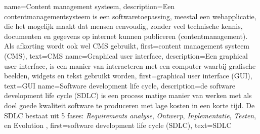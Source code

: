 \makenoidxglossaries

{
	name={Content management systeem},
	description={Een contentmanagementsysteem is een softwaretoepassing,
			meestal een webapplicatie, die het mogelijk maakt dat mensen eenvoudig, zonder veel technische kennis,
			documenten en gegevens op internet kunnen publiceren (contentmanagement).
			Als afkorting wordt ook wel CMS gebruikt},
	first={content management systeem (CMS)},
	text={CMS}
}
{
	name={Graphical user interface},
	description={Een graphical user interface, is een manier van interacteren met een computer waarbij grafische beelden, widgets en tekst gebruikt worden},
	first={graphical user interface (GUI)},
	text={GUI}
}
{
	name={Software development life cycle},
	description={de software development life cycle (SDLC) is een process matige manier van werken met als doel goede kwaliteit software te produceren met lage kosten in een korte tijd.
			De SDLC bestaat uit 5 fases: \textit{Requirements analyse}, \textit{Ontwerp}, \textit{Inplementatie}, \textit{Testen}, en Evolution \Parencite{SDLC}},
	first={software development life cycle (SDLC)},
	text={SDLC}
}
